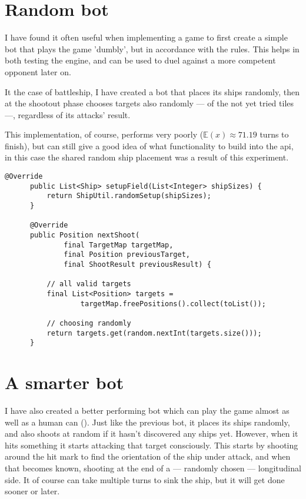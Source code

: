 		\section{Random bot}
		
		I have found it often useful when implementing a game to first create a simple bot that plays the game 'dumbly', but in accordance with the rules. This helps in both testing the engine, and can be used to duel against a more competent opponent later on.
		
		It the case of battleship, I have created a bot that places its ships randomly, then at the shootout phase chooses targets also randomly --- of the not yet tried tiles ---, regardless of its attacks' result.
		
		This implementation, of course, performs very poorly ($\mathbb{E}(x) \approx 71.19$ turns to finish), but can still give a good idea of what functionality to build into the api, in this case the shared random ship placement was a result of this experiment.
		
		\begin{center}
		\begin{minipage}{13cm}
		\begin{lstlisting}[title={\code{RandomBot.java}}]
	  @Override
      public List<Ship> setupField(List<Integer> shipSizes) {
          return ShipUtil.randomSetup(shipSizes);
      }

      @Override
      public Position nextShoot(
    	  	  final TargetMap targetMap,
    		  final Position previousTarget,
    		  final ShootResult previousResult) {
    		
    	  // all valid targets
          final List<Position> targets =
        		  targetMap.freePositions().collect(toList());
        		
          // choosing randomly
          return targets.get(random.nextInt(targets.size()));
      }
		\end{lstlisting}
			\end{minipage}
		\end{center}
		\section{A smarter bot}

		I have also created a better performing bot which can play the game almost as well as a human can (). Just like the previous bot, it places its ships randomly, and also shoots at random if it hasn't discovered any ships yet. However, when it hits something it starts attacking that target consciously. This starts by shooting around the hit mark to find the orientation of the ship under attack, and when that becomes known, shooting at the end of a --- randomly chosen --- longitudinal side. It of course can take multiple turns to sink the ship, but it will get done sooner or later.
		
